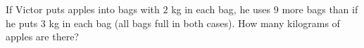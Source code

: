 If Victor puts apples into bags with $2$ kg in each bag, he uses $9$ more bags than if he puts $3$ kg in each bag (all bags full in both cases). How many kilograms of apples are there?
